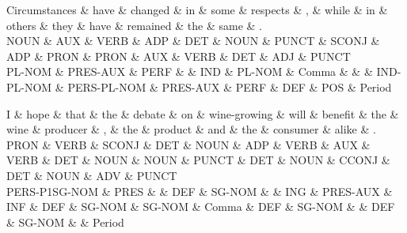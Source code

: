 \begin{dependency}
\begin{deptext}
Circumstances \& have \& changed \& in \& some \& respects \& , \& while \& in \& others \& they \& have \& remained \& the \& same \& . \\
NOUN \& AUX \& VERB \& ADP \& DET \& NOUN \& PUNCT \& SCONJ \& ADP \& PRON \& PRON \& AUX \& VERB \& DET \& ADJ \& PUNCT \\
PL-NOM \& PRES-AUX \& PERF \&  \& IND \& PL-NOM \& Comma \&  \&  \& IND-PL-NOM \& PERS-PL-NOM \& PRES-AUX \& PERF \& DEF \& POS \& Period \\
\end{deptext}



\end{dependency}

\begin{dependency}
\begin{deptext}
I \& hope \& that \& the \& debate \& on \& wine-growing \& will \& benefit \& the \& wine \& producer \& , \& the \& product \& and \& the \& consumer \& alike \& . \\
PRON \& VERB \& SCONJ \& DET \& NOUN \& ADP \& VERB \& AUX \& VERB \& DET \& NOUN \& NOUN \& PUNCT \& DET \& NOUN \& CCONJ \& DET \& NOUN \& ADV \& PUNCT \\
PERS-P1SG-NOM \& PRES \&  \& DEF \& SG-NOM \&  \& ING \& PRES-AUX \& INF \& DEF \& SG-NOM \& SG-NOM \& Comma \& DEF \& SG-NOM \&  \& DEF \& SG-NOM \&  \& Period \\
\end{deptext}



\end{dependency}

